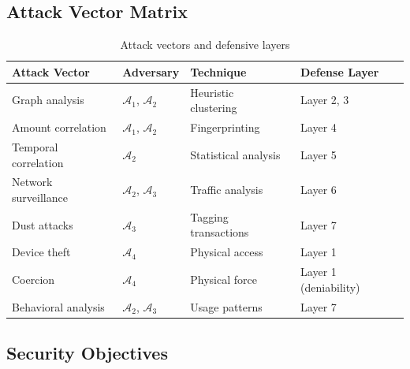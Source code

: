 \documentclass[11pt]{article}
\theoremstyle{definition}
\theoremstyle{plain}
\theoremstyle{remark}
\begin{document}
\subsection{Attack Vector Matrix}

\begin{table}[H]
\centering
\caption{Attack vectors and defensive layers}
\label{tab:vectors}
\begin{tabular}{llll}
\toprule
\textbf{Attack Vector} & \textbf{Adversary} & \textbf{Technique} & \textbf{Defense Layer} \\
\midrule
Graph analysis & $\mathcal{A}_1$, $\mathcal{A}_2$ & Heuristic clustering~\cite{meiklejohn2013fistful} & Layer 2, 3 \\
Amount correlation & $\mathcal{A}_1$, $\mathcal{A}_2$ & Fingerprinting & Layer 4 \\
Temporal correlation & $\mathcal{A}_2$ & Statistical analysis~\cite{moser2013anonymity} & Layer 5 \\
Network surveillance & $\mathcal{A}_2$, $\mathcal{A}_3$ & Traffic analysis~\cite{biryukov2014deanonymisation} & Layer 6 \\
Dust attacks & $\mathcal{A}_3$ & Tagging transactions & Layer 7 \\
Device theft & $\mathcal{A}_4$ & Physical access & Layer 1 \\
Coercion & $\mathcal{A}_4$ & Physical force & Layer 1 (deniability) \\
Behavioral analysis & $\mathcal{A}_2$, $\mathcal{A}_3$ & Usage patterns~\cite{victor2020address} & Layer 7 \\
\bottomrule
\end{tabular}
\end{table}

\subsection{Security Objectives}
\end{document}
